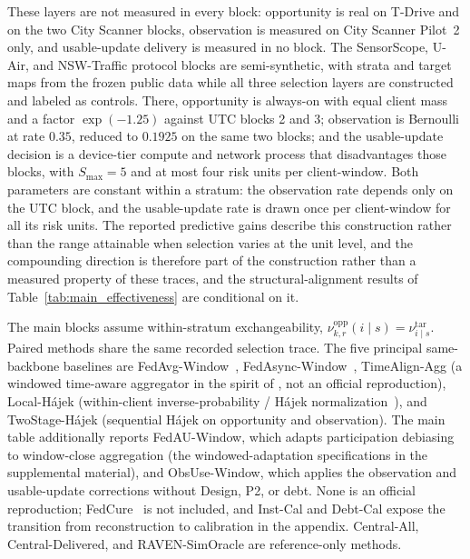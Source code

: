 \documentclass[letterpaper,journal]{IEEEtran}
\begin{document}
These layers are not measured in every block: opportunity is real on T-Drive and
on the two City Scanner blocks, observation is measured on City Scanner Pilot~2
only, and usable-update delivery is measured in no block.  The SensorScope,
U-Air, and NSW-Traffic protocol blocks are semi-synthetic, with strata and target
maps from the frozen public data while all three selection layers are constructed
and labeled as controls.  There, opportunity is always-on with equal client mass
and a factor $\exp(-1.25)$ against UTC blocks 2 and 3; observation is Bernoulli at
rate $0.35$, reduced to $0.1925$ on the same two blocks; and the usable-update
decision is a device-tier compute and network process that disadvantages those
blocks, with $S_{\max}=5$ and at most four risk units per client-window.  Both
parameters are constant within a stratum: the observation rate depends only on
the UTC block, and the usable-update rate is drawn once per client-window for all
its risk units.  The reported predictive gains describe this construction rather
than the range attainable when selection varies at the unit level, and the
compounding direction is therefore part of the construction rather than a
measured property of these traces, and the structural-alignment results of
Table~\ref{tab:main_effectiveness} are conditional on it.

The main blocks assume within-stratum exchangeability,
$\nu^{\mathrm{opp}}_{k,r}(i\mid s)=\nu^{\mathrm{tar}}_{i\mid s}$.  Paired methods
share the same recorded selection trace.
The five principal same-backbone baselines are
FedAvg-Window~\cite{mcmahan2017communication},
FedAsync-Window~\cite{xie2019asynchronous},
TimeAlign-Agg (a windowed time-aware aggregator in the spirit of
\cite{wang2026federated}, not an official reproduction),
Local-H\'ajek (within-client inverse-probability / H\'ajek
normalization~\cite{horvitz1952generalization,hajek1971comment}), and
TwoStage-H\'ajek (sequential H\'ajek on opportunity and observation).  The main
table additionally reports FedAU-Window, which adapts participation debiasing
\cite{wang2024lightweight} to window-close aggregation (the
windowed-adaptation specifications in the supplemental material), and
ObsUse-Window, which applies the observation and usable-update corrections
without Design, P2, or debt.  None is an official reproduction;
FedCure~\cite{chen2026fedcure} is not included, and Inst-Cal and Debt-Cal expose
the transition from reconstruction to calibration in the appendix.
Central-All, Central-Delivered, and RAVEN-SimOracle are reference-only methods.
\end{document}
